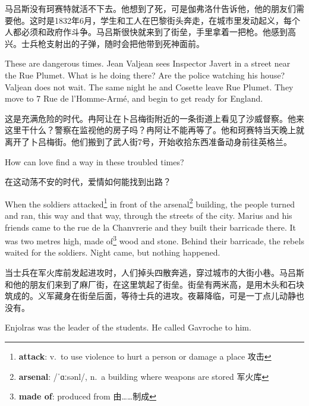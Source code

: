 \documentclass[fontset=ubuntu, zihao=5]{ctexart}
\newcommand\doulos[1]{{\fontspec{Doulos SIL} /#1/}}
\begin{document}
\begin{paracol}{2}
\switchcolumn

马吕斯没有珂赛特就活不下去。他想到了死，可是伽弗洛什告诉他，他的朋友们需要他。这时是1832年6月，学生和工人在巴黎街头奔走，在城市里发动起义，每个人都必须和政府作斗争。马吕斯很快就来到了街垒，手里拿着一把枪。他感到高兴。士兵枪支射出的子弹，随时会把他带到死神面前。

\switchcolumn*

These are dangerous times. Jean Valjean sees Inspector Javert in a street near the Rue Plumet. What is he doing there? Are the police watching his house? Valjean does not wait. The same night he and Cosette leave Rue Plumet. They move to 7 Rue de l'Homme-Armé, and begin to get ready for England.


\switchcolumn

这是充满危险的时代。冉阿让在卜吕梅街附近的一条街道上看见了沙威督察。他来这里干什么？警察在监视他的房子吗？冉阿让不能再等了。他和珂赛特当天晚上就离开了卜吕梅街。他们搬到了武人街7号，开始收拾东西准备动身前往英格兰。

\switchcolumn*

How can love find a way in these troubled times?

\switchcolumn

在这动荡不安的时代，爱情如何能找到出路？

\switchcolumn*

\sectionbreak

When the soldiers attacked\footnote{\textbf{attack}: v. to use violence to hurt
  a person or damage a place 攻击} in front of the
arsenal\footnote{\textbf{arsenal}: \doulos{ˈɑːsənl}, n. a building where
  weapons are stored 军火库} building, the people turned and ran, this way and
that way, through the streets of the city. Marius and his friends came to the
rue de la Chanvrerie and they built their barricade there. It was two metres
high, made of\footnote{\textbf{made of}: produced from 由……制成} wood and
stone. Behind their barricade, the rebels waited for the soldiers. Night came,
but nothing happened.

\switchcolumn

\sectionbreak

当士兵在军火库前发起进攻时，人们掉头四散奔逃，穿过城市的大街小巷。马吕斯和他的朋友们来到了麻厂街，在这里筑起了街垒。街垒有两米高，是用木头和石块筑成的。义军藏身在街垒后面，等待士兵的进攻。夜幕降临，可是一丁点儿动静也没有。

\switchcolumn*

Enjolras was the leader of the students. He called Gavroche to him.



\end{paracol}
\end{document}
